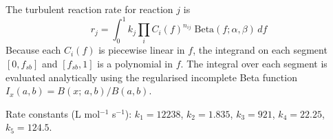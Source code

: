 \documentclass[11pt]{article}
\newcommand{\fsb}{f_{sb}}
\begin{document}
The turbulent reaction rate for reaction $j$ is
\begin{equation}
  r_j = \int_0^1 k_j \prod_i C_i(f)^{n_{ij}}\;\mathrm{Beta}(f;\alpha,\beta)\,df
  \label{eq:rate}
\end{equation}
Because each $C_i(f)$ is piecewise linear in $f$, the integrand on each segment
$[0,\fsb]$ and $[\fsb,1]$ is a polynomial in $f$.  The integral over each segment is
evaluated analytically using the regularised incomplete Beta function
$I_x(a,b) = B(x;\,a,b)/B(a,b)$.

Rate constants (L mol$^{-1}$ s$^{-1}$):
$k_1 = 12238$, $k_2 = 1.835$, $k_3 = 921$, $k_4 = 22.25$, $k_5 = 124.5$.
\end{document}
